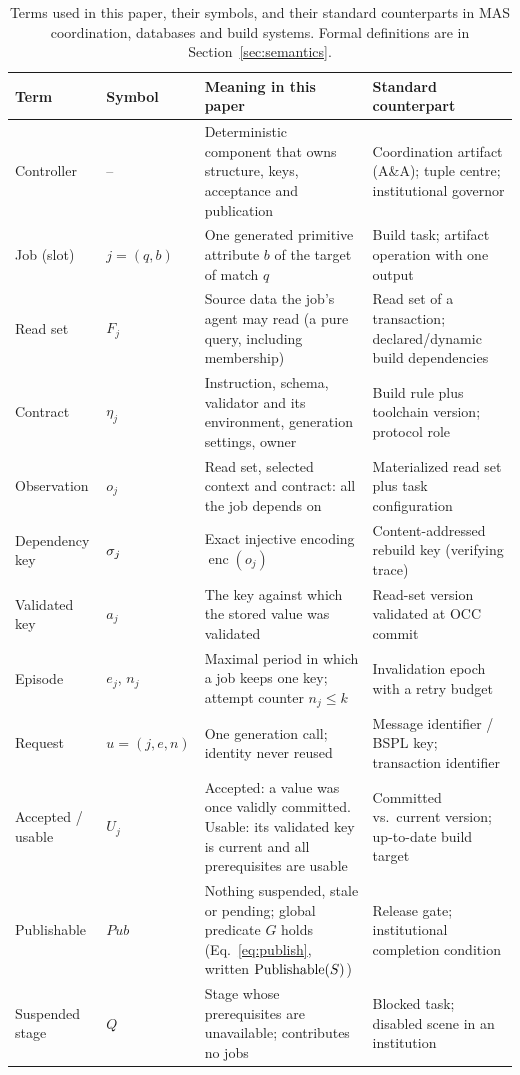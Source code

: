 \begin{table}[!t]
\centering
\caption{Terms used in this paper, their symbols, and their standard counterparts in MAS coordination, databases and build systems. Formal definitions are in Section~\ref{sec:semantics}.}\label{tab:glossary}
\footnotesize\setlength{\tabcolsep}{3pt}
\begin{tabular}{@{}P{23mm}P{14mm}P{68mm}P{62mm}@{}}\toprule
Term & Symbol & Meaning in this paper & Standard counterpart\\\midrule
Controller & -- & Deterministic component that owns structure, keys, acceptance and publication & Coordination artifact (A\&A); tuple centre; institutional governor\\
Job (slot) & $j=(q,b)$ & One generated primitive attribute $b$ of the target of match $q$ & Build task; artifact operation with one output\\
Read set & $F_j$ & Source data the job's agent may read (a pure query, including membership) & Read set of a transaction; declared/dynamic build dependencies\\
Contract & $\eta_j$ & Instruction, schema, validator and its environment, generation settings, owner & Build rule plus toolchain version; protocol role\\
Observation & $o_j$ & Read set, selected context and contract: all the job depends on & Materialized read set plus task configuration\\
Dependency key & $\sigma_j$ & Exact injective encoding $\operatorname{enc}(o_j)$ & Content-addressed rebuild key (verifying trace)\\
Validated key & $a_j$ & The key against which the stored value was validated & Read-set version validated at OCC commit\\
Episode & $e_j$, $n_j$ & Maximal period in which a job keeps one key; attempt counter $n_j\le k$ & Invalidation epoch with a retry budget\\
Request & $u=(j,e,n)$ & One generation call; identity never reused & Message identifier / BSPL key; transaction identifier\\
Accepted / usable & $U_j$ & Accepted: a value was once validly committed. Usable: its validated key is current and all prerequisites are usable & Committed vs.\ current version; up-to-date build target\\
Publishable & $\mathit{Pub}$ & Nothing suspended, stale or pending; global predicate $G$ holds (Eq.~\eqref{eq:publish}, written $\operatorname{Publishable}(S)$) & Release gate; institutional completion condition\\
Suspended stage & $Q$ & Stage whose prerequisites are unavailable; contributes no jobs & Blocked task; disabled scene in an institution\\\bottomrule
\end{tabular}
\end{table}
